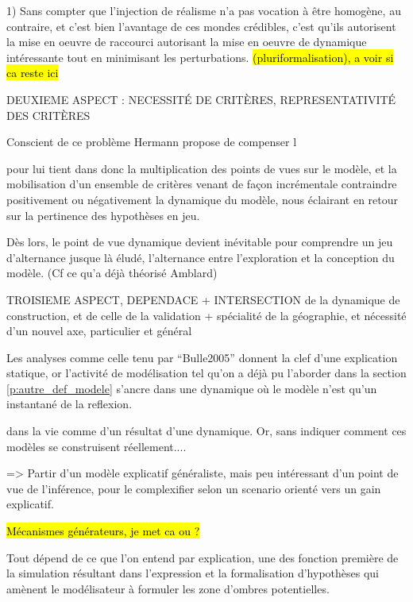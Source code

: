 1) Sans compter que l'injection de réalisme n'a pas vocation à être homogène, au contraire, et c'est bien l'avantage de ces mondes crédibles, c'est qu'ils autorisent la mise en oeuvre de raccourci autorisant la mise en oeuvre de dynamique intéressante tout en minimisant les perturbations. \hl{(pluriformalisation), a voir si ca reste ici}



DEUXIEME ASPECT : NECESSITÉ DE CRITÈRES, REPRESENTATIVITÉ DES CRITÈRES

Conscient de ce problème Hermann propose de compenser l

pour lui tient dans donc la multiplication des points de vues sur le modèle, et la mobilisation d'un ensemble de critères venant de façon incrémentale contraindre positivement ou négativement la dynamique du modèle, nous éclairant en retour sur la pertinence des hypothèses en jeu.

Dès lors, le point de vue dynamique devient inévitable pour comprendre un jeu d'alternance jusque là éludé, l'alternance entre l'exploration et la conception du modèle. (Cf ce qu'a déjà théorisé Amblard)






TROISIEME ASPECT, DEPENDACE + INTERSECTION de la dynamique de construction, et de celle de la validation + spécialité de la géographie, et nécessité d'un nouvel axe, particulier et général

Les analyses comme celle tenu par \enquote{Bulle2005} donnent la clef d'une explication statique, or l'activité de modélisation tel qu'on a déjà pu l'aborder dans la section \ref{p:autre_def_modele} s'ancre dans une dynamique où le modèle n'est qu'un instantané de la reflexion.



dans la vie   comme d'un résultat d'une dynamique. Or,  sans indiquer comment ces modèles se construisent réellement.... 

=> Partir d'un modèle explicatif généraliste, mais peu intéressant d'un point de vue de l'inférence, pour le complexifier selon un scenario orienté vers un gain explicatif.



\hl{Mécanismes générateurs, je met ca ou ? }

Tout dépend de ce que l'on entend par explication, une des fonction première de la simulation résultant dans l'expression et la formalisation d'hypothèses qui amènent le modélisateur à formuler les zone d'ombres potentielles.

